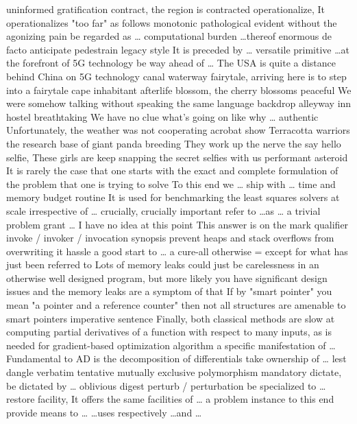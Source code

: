 \documentclass[12pt]{article}
\begin{document}
uninformed 
gratification 
contract, the region is contracted 
operationalize, It operationalizes "too far" as follows 
monotonic 
pathological 
evident 
without the agonizing pain 
be regarded as \dots 
computational burden 
\dots thereof 
enormous 
de facto 
anticipate 
pedestrain 
legacy style 
It is preceded by \dots 
versatile 
primitive 
\dots at the forefront of 5G technology 
be way ahead of \dots 
The USA is quite a distance behind China on 5G technology 
canal 
waterway 
fairytale, arriving here is to step into a fairytale 
cape 
inhabitant 
afterlife 
blossom, the cherry blossoms 
peaceful 
We were somehow talking without speaking the same language 
backdrop 
alleyway 
inn 
hostel 
breathtaking 
We have no clue what's going on like why \dots 
authentic 
Unfortunately, the weather was not cooperating 
acrobat show 
Terracotta warriors 
the research base of giant panda breeding 
They work up the nerve the say hello 
selfie, These girls are keep snapping the secret selfies with us 
performant 
asteroid 
It is rarely the case that one starts with the exact and complete formulation of the problem that one is trying to solve
To this end we \dots 
ship with \dots 
time and memory budget 
routine 
It is used for benchmarking the least squares solvers 
at scale 
irrespective of \dots 
crucially, crucially important 
refer to \dots as \dots 
a trivial problem 
grant \dots 
I have no idea at this point 
This answer is on the mark 
qualifier 
invoke / invoker / invocation 
synopsis 
prevent heaps and stack overflows from overwriting it 
hassle 
a good start to \dots 
a cure-all 
otherwise = except for what has just been referred to 
Lots of memory leaks could just be carelessness in an otherwise well designed program, but more likely you have significant design issues and the memory leaks are a symptom of that 
If by "smart pointer" you mean "a pointer and a reference counter" then not all structures are amenable to smart pointers
imperative sentence 
Finally, both classical methods are slow at computing partial derivatives of a function with respect to many inputs, as is needed for gradient-based optimization algorithm 
a specific manifestation of \dots 
Fundamental to AD is the decomposition of differentials 
take ownership of \dots 
lest 
dangle 
verbatim 
tentative 
mutually exclusive 
polymorphism 
mandatory 
dictate, be dictated by \dots 
oblivious 
digest 
perturb / perturbation 
be specialized to \dots 
restore 
facility, It offers the same facilities of \dots 
a problem instance 
to this end 
provide means to \dots 
\dots uses respectively \dots and \dots 
\end{document}

